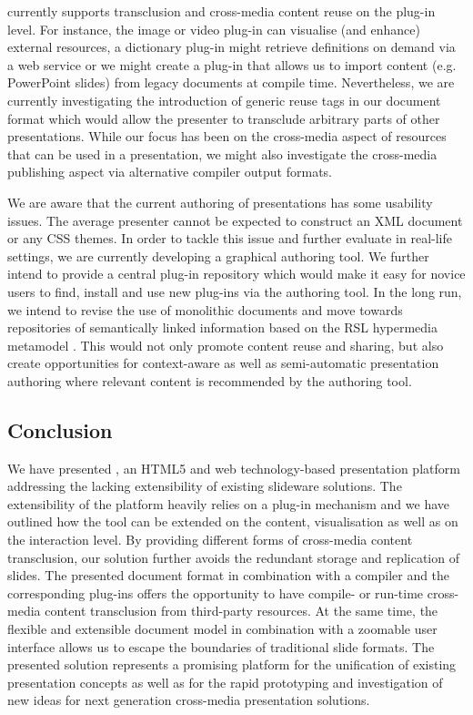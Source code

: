     \mxp currently supports transclusion and cross-media content reuse on the
    plug-in level. For instance, the image or video plug-in can visualise (and
    enhance) external resources, a dictionary plug-in might retrieve
    definitions on demand via a web service or we might create a plug-in that
    allows us to import content (e.g. PowerPoint slides) from legacy documents
    at compile time. Nevertheless, we are currently investigating the
    introduction of generic reuse tags in our document format which would allow
    the presenter to transclude arbitrary parts of other \mxp presentations.
    While our focus has been on the cross-media aspect of resources that can be
    used in a presentation, we might also investigate the cross-media
    publishing aspect via alternative compiler output formats.

    We are aware that the current authoring of \mxp presentations has some
    usability issues. The average presenter cannot be expected to construct an
    XML document or any CSS themes. In order to tackle this issue and further
    evaluate \mxp in real-life settings, we are currently developing a
    graphical \mxp authoring tool. We further intend to provide a central
    plug-in repository which would make it easy for novice users to find,
    install and use new plug-ins via the authoring tool. In the long run, we
    intend to revise the use of monolithic documents and move towards
    repositories of semantically linked information based on the RSL hypermedia
    metamodel \citep{signer-3}. This would not only promote content reuse and
    sharing, but also create opportunities for context-aware as well as
    semi-automatic presentation authoring where relevant content is recommended
    by the authoring tool.

   \subsection{Conclusion}

    We have presented \mxp, an HTML5 and web technology-based presentation
    platform addressing the lacking extensibility of existing slideware
    solutions. The extensibility of the \mxp platform heavily relies on a
    plug-in mechanism and we have outlined how the tool can be extended on the
    content, visualisation as well as on the interaction level. By providing
    different forms of cross-media content transclusion, our solution further
    avoids the redundant storage and replication of slides. The presented \mxp
    document format in combination with a compiler and the corresponding
    plug-ins offers the opportunity to have compile- or run-time cross-media
    content transclusion from third-party resources. At the same time, the
    flexible and extensible document model in combination with a zoomable user
    interface allows us to escape the boundaries of traditional slide formats.
    The presented \mxp solution represents a promising platform for the
    unification of existing presentation concepts as well as for the rapid
    prototyping and investigation of new ideas for next generation cross-media
    presentation solutions.

